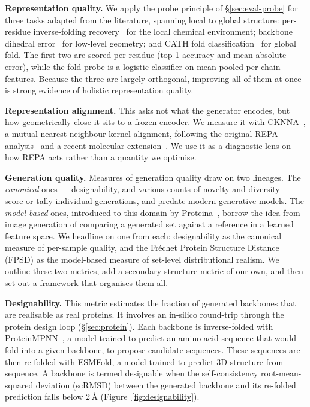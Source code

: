 \documentclass[12pt,a4paper,twoside]{report}
\begin{document}
\textbf{Representation quality.} We apply the probe principle of \S\ref{sec:eval-probe} for three tasks adapted from the literature, spanning local to global structure: per-residue inverse-folding recovery~\cite{Ingraham2019} for the local chemical environment; backbone dihedral error~\cite{ProteinWorkshop} for low-level geometry; and CATH fold classification~\cite{ProteinWorkshop} for global fold. The first two are scored per residue (top-1 accuracy and mean absolute error), while the fold probe is a logistic classifier on mean-pooled per-chain features. Because the three are largely orthogonal, improving all of them at once is strong evidence of holistic representation quality.

\textbf{Representation alignment.} This asks not what the generator encodes, but how geometrically close it sits to a frozen encoder. We measure it with CKNNA~\cite{PlatonicRep}, a mutual-nearest-neighbour kernel alignment, following the original REPA analysis~\cite{REPA} and a recent molecular extension~\cite{BoltzREPA}. We use it as a diagnostic lens on how REPA acts rather than a quantity we optimise.

\textbf{Generation quality.} Measures of generation quality draw on two lineages. The \emph{canonical} ones --- designability, and various counts of novelty and diversity --- score or tally individual generations, and predate modern generative models. The \emph{model-based} ones, introduced to this domain by Proteina~\cite{Proteina}, borrow the idea from image generation of comparing a generated set against a reference in a learned feature space. We headline on one from each: designability as the canonical measure of per-sample quality, and the Fr\'echet Protein Structure Distance (FPSD) as the model-based measure of set-level distributional realism. We outline these two metrics, add a secondary-structure metric of our own, and then set out a framework that organises them all.

\textbf{Designability.} This metric estimates the fraction of generated backbones that are realisable as real proteins. It involves an in-silico round-trip through the protein design loop (\S\ref{sec:protein}). Each backbone is inverse-folded with ProteinMPNN~\cite{ProteinMPNN}, a model trained to predict an amino-acid sequence that would fold into a given backbone, to propose candidate sequences. These sequences are then re-folded with ESMFold, a model trained to predict 3D structure from sequence. A backbone is termed designable when the self-consistency root-mean-squared deviation (scRMSD) between the generated backbone and its re-folded prediction falls below 2\,\AA{} (Figure~\ref{fig:designability}).
\end{document}
